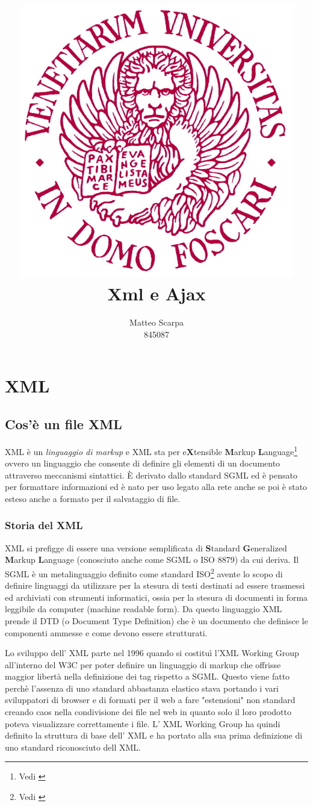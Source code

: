 \documentclass[a4paper,12pt]{report}
\title{\includegraphics[width=120mm]{logo-unive.png} \\ Xml e Ajax}
\author{Matteo Scarpa\\ 845087}
\date{}
\begin{document}
\maketitle
\newpage
\tableofcontents
\newpage

\chapter{XML}
\section{Cos'è un file XML}
XML è un \textit{linguaggio di markup} e XML sta per e\textbf{X}tensible \textbf{M}arkup \textbf{L}anguage\footnote{Vedi \cite{site:w3cxml}} ovvero un linguaggio che consente di definire gli elementi di un documento attraverso meccanismi sintattici.
È derivato dallo standard SGML  ed è pensato per formattare informazioni ed è nato per uso legato alla rete anche se poi è stato esteso anche a formato per il salvataggio di file.

\subsection{Storia del XML}
XML si prefigge di essere una versione semplificata di \textbf{S}tandard \textbf{G}eneralized \textbf{M}arkup \textbf{L}anguage (conosciuto anche come SGML o ISO 8879) da cui deriva.
Il SGML è un metalinguaggio definito come standard ISO\footnote{Vedi \cite{site:isosgml}} avente lo scopo di definire linguaggi da utilizzare per la stesura di testi destinati ad essere trasmessi ed archiviati con strumenti informatici, ossia per la stesura di documenti in forma leggibile da computer (machine readable form). Da questo linguaggio XML prende il DTD (o Document Type Definition) che è un documento che definisce le componenti ammesse e come devono essere strutturati.

Lo sviluppo dell' XML parte nel 1996 quando si costituì l’XML Working Group all'interno del W3C per poter definire un linguaggio di markup che offrisse maggior libertà nella definizione dei tag rispetto a SGML. Questo viene fatto perchè l'assenza di uno standard abbastanza elastico stava portando i vari sviluppatori di browser e di formati per il web a fare "estensioni" non standard creando caos nella condivisione dei file nel web in quanto solo il loro prodotto poteva visualizzare correttamente i file.
L' XML Working Group ha quindi definito la struttura di base dell' XML e ha portato alla sua prima definizione di uno standard riconosciuto dell XML. 
\end{document}
